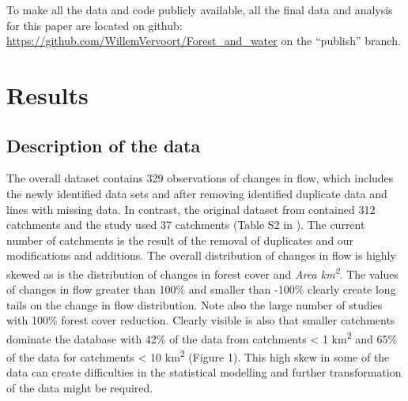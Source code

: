 \documentclass[]{elsarticle} %
\begin{document}
To make all the data and code publicly available, all the final data and analysis for this paper are located on github:\\
\href{https://github.com/WillemVervoort/Forest_and_water/tree/publish}{https://github.com/WillemVervoort/Forest\_and\_water} on the ``publish'' branch.

\hypertarget{results}{%
\section{Results}\label{results}}

\hypertarget{description-of-the-data}{%
\subsection{Description of the data}\label{description-of-the-data}}

The overall dataset contains 329 observations of changes in flow, which includes the newly identified data sets and after removing identified duplicate data and lines with missing data. In contrast, the original dataset from \citet{zhang2017} contained 312 catchments and the \citet{filoso2017} study used 37 catchments (Table S2 in \citet{filoso2017}). The current number of catchments is the result of the removal of duplicates and our modifications and additions. The overall distribution of changes in flow is highly skewed as is the distribution of changes in forest cover and \emph{Area km\textsuperscript{2}}. The values of changes in flow greater than 100\% and smaller than -100\% clearly create long tails on the change in flow distribution. Note also the large number of studies with 100\% forest cover reduction. Clearly visible is also that smaller catchments dominate the database with 42\% of the data from catchments \textless{} 1 km\textsuperscript{2} and 65\% of the data for catchments \textless{} 10 km\textsuperscript{2} (Figure 1). This high skew in some of the data can create difficulties in the statistical modelling and further transformation of the data might be required.
\end{document}
